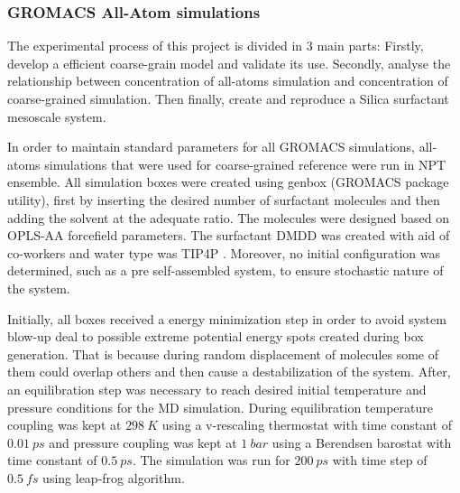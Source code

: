 \documentclass[10pt,a4paper,twoside]{article}
\begin{document}
\subsubsection*{GROMACS All-Atom simulations}
The experimental process of this project is divided in 3 main parts: Firstly, develop a efficient coarse-grain model and validate its use. Secondly, analyse the relationship between concentration  of all-atoms simulation and concentration of coarse-grained simulation. Then finally, create and reproduce a Silica surfactant mesoscale system. 

In order to maintain standard parameters for all GROMACS simulations, all-atoms simulations that were used for coarse-grained reference were run in NPT ensemble. All simulation boxes were created using genbox (GROMACS package utility), first by inserting the desired number of surfactant molecules and then adding the solvent at the adequate ratio. The molecules were designed based on OPLS-AA forcefield \cite{opls} parameters. %
The surfactant DMDD was created with aid of co-workers and water type was TIP4P \cite{tip4p}. %
Moreover, no initial configuration was determined, such as a pre self-assembled system, to ensure stochastic nature of the system.  

Initially, all boxes received a energy minimization step in order to avoid system blow-up deal to possible extreme potential energy spots created during box generation. That is because during random displacement of molecules some of them could overlap others and then cause a destabilization of the system. After, an equilibration step was necessary to reach desired initial temperature and pressure conditions for the MD simulation. During equilibration temperature coupling was kept at $298\ K$ using a v-rescaling thermostat \cite{vtstat} with time constant of $0.01\ ps$ and pressure coupling was kept at $1\ bar$ using a Berendsen barostat \cite{bbtat} with time constant of $0.5\ ps$.  The simulation was run for $200\ ps$ with time step of $0.5\ fs$ using leap-frog algorithm.
\end{document}
